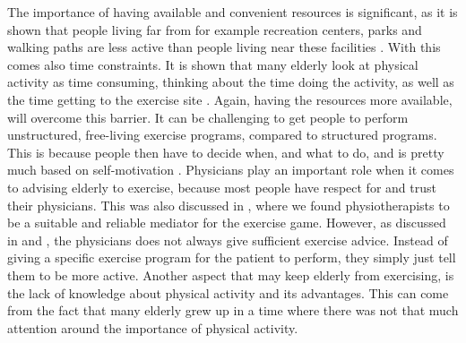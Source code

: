The importance of having available and convenient resources is significant, as it is shown that people living far from for example recreation centers, parks and walking paths are less active than people living near these facilities \cite{schutzer}. With this comes also time constraints. It is shown that many elderly look at physical activity as time consuming, thinking about the time doing the activity, as well as the time getting to the exercise site \cite{schutzer} \cite{chao}. Again, having the resources more available, will overcome this barrier. It can be challenging to get people to perform unstructured, free-living exercise programs, compared to structured programs. This is because people then have to decide when, and what to do, and is pretty much based on self-motivation \cite{chao}.  Physicians play an important role when it comes to advising elderly to exercise, because most people have respect for and trust their physicians. This was also discussed in \cite{project}, where we found physiotherapists to be a suitable and reliable mediator for the exercise game. However, as discussed in \cite{schutzer} and \cite{chao}, the physicians does not always give sufficient exercise advice. Instead of giving a specific exercise program for the patient to perform, they simply just tell them to be more active. Another aspect that may keep elderly from exercising, is the lack of knowledge about physical activity and its advantages. This can come from the fact that many elderly grew up in a time where there was not that much attention around the importance of physical activity. 

